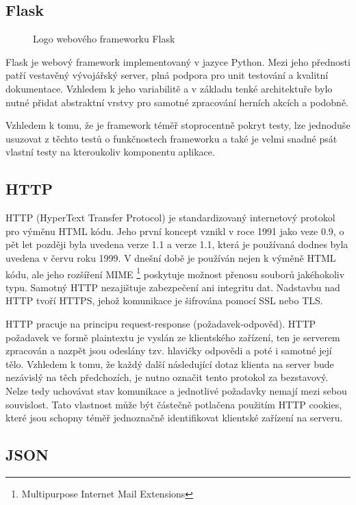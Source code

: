 \documentclass[10pt,titlepage,a4paper]{extarticle}
\begin{document}
\subsection{Flask}

\begin{figure}[H]
 \centering
 
 \caption{Logo webového frameworku Flask}
\end{figure}

Flask je webový framework implementovaný v jazyce Python. Mezi jeho přednosti patří vestavěný vývojářský server, plná podpora pro unit testování a kvalitní dokumentace. Vzhledem k jeho variabilitě a v základu tenké architektuře bylo nutné přidat abstraktní vrstvy pro samotné zpracování herních akcích a podobně.

Vzhledem k tomu, že je framework téměř stoprocentně pokryt testy, lze jednoduše usuzovat z těchto testů o funkčnostech frameworku a také je velmi snadné psát vlastní testy na kteroukoliv komponentu aplikace.
\subsection{HTTP}

HTTP (HyperText Transfer Protocol) je standardizovaný internetový protokol pro výměnu HTML kódu. Jeho první koncept vznikl v roce 1991 jako veze 0.9, o pět let později byla uvedena verze 1.1 a verze 1.1, která je používaná dodnes byla uvedena v červu roku 1999. V dnešní době je používán nejen k výměně HTML kódu, ale jeho rozšíření MIME \footnote{Multipurpose Internet Mail Extensions} poskytuje možnost přenosu souborů jakéhokoliv typu. Samotný HTTP nezajištuje zabezpečení ani integritu dat. Nadstavbu nad HTTP tvoří HTTPS, jehož komunikace je šifrována pomocí SSL nebo TLS.

HTTP pracuje na principu request-response (požadavek-odpověd). HTTP požadavek ve formě plaintextu je vyslán ze klientského zařízení, ten je serverem zpracován a nazpět jsou odeslány tzv. hlavičky odpovědi a poté i samotné její tělo. Vzhledem k tomu, že každý další následující dotaz klienta na server bude nezávislý na těch předchozích, je nutno označit tento protokol za bezstavový. Nelze tedy uchovávat stav komunikace a jednotlivé požadavky nemají mezi sebou souvislost. Tato vlastnost může být částečně potlačena použitím HTTP cookies, které jsou schopny téměř jednoznačně identifikovat klientské zařízení na serveru.

\subsection{JSON}
\end{document}
